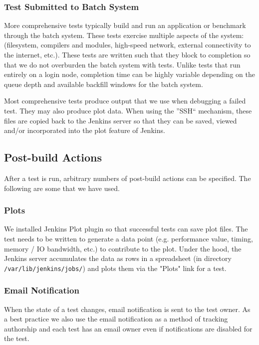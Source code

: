 \documentclass[10pt, conference, compsocconf]{IEEEtran}
\begin{document}
\subsubsection{Test Submitted to Batch System}
More comprehensive tests typically build and run an application or benchmark through the batch system.  
These tests exercise multiple aspects of the system: (filesystem, compilers and modules, high-speed network, external connectivity to the internet, etc.). 
These tests are written such that they block to completion so that we do not overburden the batch system with tests. 
Unlike tests that run entirely on a login node, completion time can be highly variable depending on the queue depth and available backfill windows for the batch system.
 

Most comprehensive tests produce output that we use when debugging a failed test. 
They may also produce plot data. When using the ''SSH`` mechanism, these files are copied back to the Jenkins server so that they can be saved, viewed and/or incorporated into the plot feature of Jenkins. 
 
\subsection{Post-build Actions}

After a test is run, arbitrary numbers of post-build actions can be specified. 
The following are some that we have used. 

\subsubsection{Plots}
We installed Jenkins Plot plugin \cite{JenkinsPlotPlugin} so that successful tests can save plot files. 
The test needs to be written to generate a data point (e.g. performance value, timing, memory / IO bandwidth, etc.) to contribute to the plot. 
Under the hood, the Jenkins server accumulates the data as rows in a spreadsheet (in directory \texttt{/var/lib/jenkins/jobs/}) and plots them via the "Plots" link for a test.

\subsubsection{Email Notification}
When the state of a test changes, email notification is sent to the test owner. 
As a best practice we also use the email notification as a method of tracking authorship and each test has an email owner even if notifications are disabled for the test.
\end{document}
